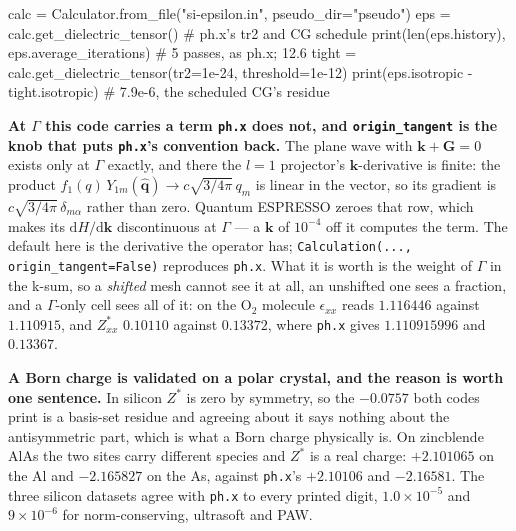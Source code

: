 \documentclass[11pt,a4paper]{article}
\newcommand{\code}[1]{\texttt{\small #1}}
\begin{document}
\begin{pycode}
calc = Calculator.from_file("si-epsilon.in", pseudo_dir="pseudo")
eps = calc.get_dielectric_tensor()          # ph.x's tr2 and CG schedule
print(len(eps.history), eps.average_iterations)   # 5 passes, as ph.x; 12.6
tight = calc.get_dielectric_tensor(tr2=1e-24, threshold=1e-12)
print(eps.isotropic - tight.isotropic)      # 7.9e-6, the scheduled CG's residue
\end{pycode}

\textbf{At $\Gamma$ this code carries a term \code{ph.x} does not, and
\code{origin\_tangent} is the knob that puts \code{ph.x}'s convention back.}
The plane wave with $\mathbf k+\mathbf G=0$ exists only at $\Gamma$ exactly, and
there the $l=1$ projector's $\mathbf k$-derivative is finite: the product
$f_1(q)\,Y_{1m}(\hat{\mathbf q})\to c\sqrt{3/4\pi}\,q_m$ is linear in the
vector, so its gradient is $c\sqrt{3/4\pi}\,\delta_{m\alpha}$ rather than zero.
Quantum ESPRESSO zeroes that row, which makes its $\mathrm{d}H/\mathrm{d}\mathbf k$
discontinuous at $\Gamma$ --- a $\mathbf k$ of $10^{-4}$ off it computes the
term. The default here is the derivative the operator has;
\code{Calculation(..., origin\_tangent=False)} reproduces \code{ph.x}. What it
is worth is the weight of $\Gamma$ in the k-sum, so a \emph{shifted} mesh cannot
see it at all, an unshifted one sees a fraction, and a $\Gamma$-only cell sees
all of it: on the O$_2$ molecule $\epsilon_{xx}$ reads $1.116446$ against
$1.110915$, and $Z^{\ast}_{xx}$ $0.10110$ against $0.13372$, where \code{ph.x}
gives $1.110915996$ and $0.13367$.

\textbf{A Born charge is validated on a polar crystal, and the reason is worth
one sentence.} In silicon $Z^{\ast}$ is zero by symmetry, so the $-0.0757$ both
codes print is a basis-set residue and agreeing about it says nothing about the
antisymmetric part, which is what a Born charge physically is. On zincblende
AlAs the two sites carry different species and $Z^{\ast}$ is a real charge:
$+2.101065$ on the Al and $-2.165827$ on the As, against \code{ph.x}'s
$+2.10106$ and $-2.16581$. The three silicon datasets agree with \code{ph.x} to
every printed digit, $1.0\times10^{-5}$ and $9\times10^{-6}$ for
norm-conserving, ultrasoft and PAW.
\end{document}
